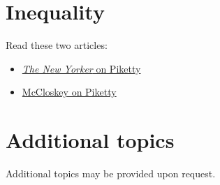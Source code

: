 \documentclass[
    letterpaper,paper=portrait,fleqn,
    DIV=16,fontsize=11pt,twoside=false,
    parskip=full-,
    headings=standardclasses]
{scrartcl}
\begin{document}
\section{Inequality}

Read these two articles:

\begin{itemize}
\item \href{https://www.newyorker.com/magazine/2020/03/09/thomas-piketty-goes-global}{\emph{The New Yorker} on Piketty}
\item \href{https://www.cato.org/policy-report/july/august-2015/how-piketty-misses-point}{McCloskey on Piketty}
\end{itemize}

\section*{Additional topics}

Additional topics may be provided upon request.
\end{document}
